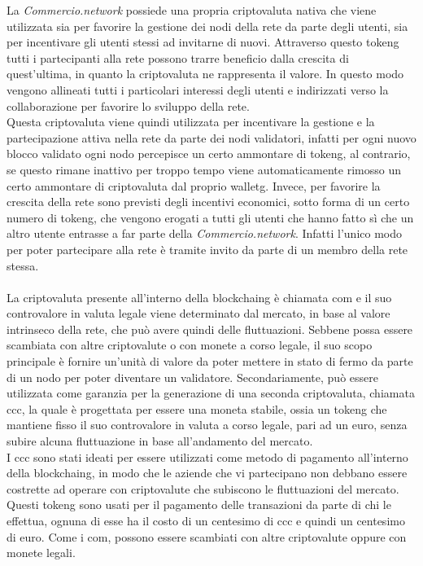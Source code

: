 La \textit{Commercio.network} possiede una propria criptovaluta nativa che viene utilizzata sia per favorire la gestione dei nodi della rete da parte degli utenti, sia per incentivare gli utenti stessi ad invitarne di nuovi. Attraverso questo \gls{tokeng} tutti i partecipanti alla rete possono trarre beneficio dalla crescita di quest'ultima, in quanto la criptovaluta ne rappresenta il valore. In questo modo vengono allineati tutti i particolari interessi degli utenti e indirizzati verso la collaborazione per favorire lo sviluppo della rete.\\
Questa criptovaluta viene quindi utilizzata per incentivare la gestione e la partecipazione attiva nella rete da parte dei nodi validatori, infatti per ogni nuovo blocco validato ogni nodo percepisce un certo ammontare di \gls{tokeng}, al contrario, se questo rimane inattivo per troppo tempo viene automaticamente rimosso un certo ammontare di criptovaluta dal proprio \gls{walletg}. Invece, per favorire la crescita della rete sono previsti degli incentivi economici, sotto forma di un certo numero di \gls{tokeng}, che vengono erogati a tutti gli utenti che hanno fatto sì che un altro utente entrasse a far parte della \textit{Commercio.network}. Infatti l'unico modo per poter partecipare alla rete è tramite invito da parte di un membro della rete stessa.\\\\
La criptovaluta presente all'interno della \gls{blockchaing} è chiamata \gls{com}\glsfirstoccur{} e il suo controvalore in valuta legale viene determinato dal mercato, in base al valore intrinseco della rete, che può avere quindi delle fluttuazioni. Sebbene possa essere scambiata con altre criptovalute o con monete a corso legale, il suo scopo principale è fornire un'unità di valore da poter mettere in stato di fermo da parte di un nodo per poter diventare un validatore. Secondariamente, può essere utilizzata come garanzia per la generazione di una seconda criptovaluta, chiamata \gls{ccc}\glsfirstoccur, la quale è progettata per essere una moneta stabile, ossia un \gls{tokeng} che mantiene fisso il suo controvalore in valuta a corso legale, pari ad un euro, senza subire alcuna fluttuazione in base all'andamento del mercato.\\
I \gls{ccc} sono stati ideati per essere utilizzati come metodo di pagamento all'interno della \gls{blockchaing}, in modo che le aziende che vi partecipano non debbano essere costrette ad operare con criptovalute che subiscono le fluttuazioni del mercato. Questi \gls{tokeng} sono usati per il pagamento delle transazioni da parte di chi le effettua, ognuna di esse ha il costo di un centesimo di \gls{ccc} e quindi un centesimo di euro. Come i \gls{com}, possono essere scambiati con altre criptovalute oppure con monete legali.

